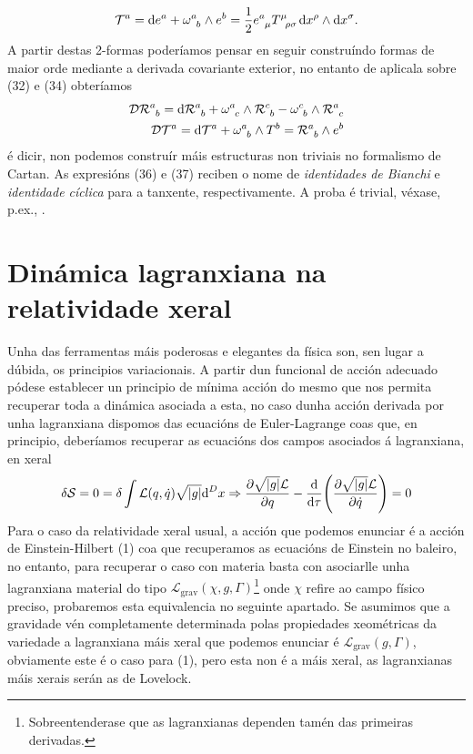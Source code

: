 \begin{align}
    \mathcal{T}\indices{^a} =\dd e^a + \omega\indices{^a_b}\wedge e^b = \frac{1}{2}\viel T\indices{^\mu_\rho_\sigma}\dd x^\rho\wedge\dd x^\sigma.
\end{align}
A partir destas 2-formas poderíamos pensar en seguir construíndo formas de maior orde mediante a derivada covariante exterior, no entanto de aplicala sobre (32) e (34) obteríamos
\begin{align}
    \mathcal{D}\mathcal{R}\indices{^a_b} =\dd \mathcal{R}\indices{^a_b}  + \omega\indices{^a_c}\wedge\mathcal{R}\indices{^c_b} - \omega\indices{^c_b}\wedge\mathcal{R}\indices{^a_c} \\
    \mathcal{D}\mathcal{T}\indices{^a} = \dd\mathcal{T}\indices{^a} + \omega\indices{^a_b}\wedge T^b = \mathcal{R}\indices{^a_b}\wedge e^b
\end{align}
é dicir, non podemos construír máis estructuras non triviais no formalismo de Cartan. As expresións (36) e (37) reciben o nome de \textit{identidades de Bianchi} e \textit{identidade cíclica} para a tanxente, respectivamente. A proba é trivial, véxase, p.ex.,
\cite{lovelock-1989}.


\section{Dinámica lagranxiana na relatividade xeral}
Unha das ferramentas máis poderosas e elegantes da física son, sen lugar a dúbida, os principios variacionais. A partir dun funcional de acción adecuado pódese establecer un principio de mínima acción do mesmo que nos permita recuperar toda a dinámica asociada a esta, no caso dunha acción derivada por unha lagranxiana dispomos das ecuacións de Euler-Lagrange coas que, en principio, deberíamos recuperar as ecuacións dos campos asociados á lagranxiana, en xeral
\begin{align}
    \delta\mathcal{S} = 0=\delta\int\mathcal{L}(q,\dot q)\sqrt{\abs g}\dd^D x\Rightarrow \diffp {\sqrt{\abs g}\mathcal L}{q}-\diff*{\diffp{\sqrt{\abs g}\mathcal L}{\dot{q}}[]}\tau = 0
\end{align}
Para o caso da relatividade xeral usual, a acción que podemos enunciar é a acción de Einstein-Hilbert (1) coa que recuperamos as ecuacións de Einstein no baleiro, no entanto, para recuperar o caso con materia basta con asociarlle unha lagranxiana material do tipo $\mathcal{L}_{\text{grav}}(\chi,g,\Gamma)$\footnote{Sobreentenderase que as lagranxianas dependen tamén das primeiras derivadas.} onde $\chi$ refire ao campo físico preciso, probaremos esta equivalencia no seguinte apartado. Se asumimos que a gravidade vén completamente determinada polas propiedades xeométricas da variedade a lagranxiana máis xeral que podemos enunciar é $\mathcal{L}_{\text{grav}}(g,\Gamma)$, obviamente este é o caso para (1), pero esta non é a máis xeral, as lagranxianas máis xerais serán as de Lovelock.

